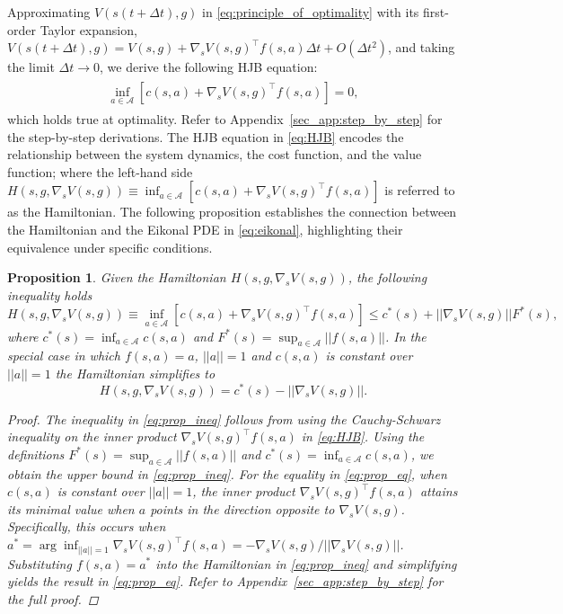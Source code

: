 \documentclass{article}
\theoremstyle{plain}
\newtheorem{proposition}[theorem]{Proposition}
\theoremstyle{definition}
\theoremstyle{remark}
\begin{document}
Approximating $V(s(t+\Delta t), g)$ in \eqref{eq:principle_of_optimality} with its first-order Taylor expansion, $V(s(t+\Delta t), g) = V(s, g) + \nabla_s V(s,g)^{\intercal}f(s,a)\Delta t + O(\Delta t^2)$, and taking the limit $\Delta t \to 0$, we derive the following HJB equation:
\begin{align}
    \begin{split}
        \inf_{a \in \mathcal{A}} [c(s, a) + \nabla_s V(s, g)^{\intercal}f(s,a)] = 0,
        \label{eq:HJB}
    \end{split}
\end{align}
which holds true at optimality. Refer to Appendix~\ref{sec_app:step_by_step} for the step-by-step derivations. The HJB equation in \eqref{eq:HJB} encodes the relationship between the system dynamics, the cost function, and the value function; where the left-hand side $H(s, g, \nabla_s V(s, g)) \equiv \inf_{a \in \mathcal{A}} [c(s, a) + \nabla_s V(s, g)^{\intercal}f(s,a)]$ is referred to as the Hamiltonian. The following proposition establishes the connection between the Hamiltonian and the Eikonal PDE in \eqref{eq:eikonal}, highlighting their equivalence under specific conditions.
\begin{proposition}
    \label{prop:HJB_Eik}
    Given the Hamiltonian $H(s, g, \nabla_s V(s, g))$, the following inequality holds
    \begin{equation}
        H(s, g, \nabla_s V(s, g)) \equiv \inf_{a \in \mathcal{A}} [c(s, a) + \nabla_s V(s, g)^{\intercal}f(s,a)] \leq c^*(s) + ||\nabla_s V(s, g)|| F^*(s),
        \label{eq:prop_ineq}
    \end{equation}
    where $c^*(s) = \inf_{a \in \mathcal{A}}c(s,a)$ and $F^*(s) = \sup_{a \in \mathcal{A}}||f(s,a)||$. In the special case in which $f(s,a) = a$, $||a||=1$ and $c(s,a)$ is constant over $||a||=1$ the Hamiltonian simplifies to
    \begin{equation}
        H(s, g, \nabla_s V(s, g)) = c^*(s) - ||\nabla_s V(s, g)||.
        \label{eq:prop_eq}
    \end{equation}
    \begin{proof}
        The inequality in \eqref{eq:prop_ineq} follows from using the Cauchy-Schwarz inequality on the inner product $\nabla_s V(s, g)^{\intercal}f(s,a)$ in \eqref{eq:HJB}. Using the definitions $F^*(s) = \sup_{a \in \mathcal{A}}||f(s,a)||$ and  $c^*(s) = \inf_{a \in \mathcal{A}}c(s,a)$, we obtain the upper bound in \eqref{eq:prop_ineq}. For the equality in \eqref{eq:prop_eq}, when $c(s,a)$ is constant over $||a||=1$, the inner product $\nabla_s V(s, g)^{\intercal}f(s,a)$ attains its minimal value when $a$ points in the direction opposite to $\nabla_s V(s, g)$. Specifically, this occurs when $a^* = \arg\inf_{||a||=1} \nabla_s V(s, g)^{\intercal}f(s,a) = -\nabla_s V(s, g)/||\nabla_s V(s, g)||$. Substituting $f(s,a) = a^*$ into the Hamiltonian in \eqref{eq:prop_ineq} and simplifying yields the result in \eqref{eq:prop_eq}. Refer to Appendix~\ref{sec_app:step_by_step} for the full proof.
    \end{proof}
\end{proposition}
\end{document}
